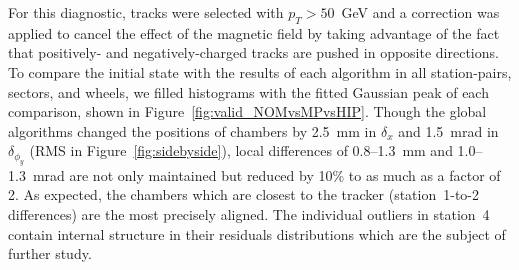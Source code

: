 For this diagnostic, tracks were selected with $p_T > 50$~GeV and a
correction was applied to cancel the effect of the magnetic field by
taking advantage of the fact that positively- and negatively-charged
tracks are pushed in opposite directions.
To compare the initial state with the results of each algorithm in all
station-pairs, sectors, and wheels, we filled histograms with the
fitted Gaussian peak of each comparison, shown in
Figure~\ref{fig:valid_NOMvsMPvsHIP}.  Though the global algorithms
changed the positions of chambers by 2.5~mm in $\delta_x$ and 1.5~mrad
in $\delta_{\phi_y}$ (RMS in Figure~\ref{fig:sidebyside}), local
differences of 0.8--1.3~mm and 1.0--1.3~mrad are not only maintained
but reduced by 10\% to as much as a factor of 2.  As expected, the chambers which are closest
to the tracker (station~1-to-2 differences) are the most precisely
aligned.  The individual outliers in station~4 contain internal
structure in their residuals distributions which are the subject of
further study.

 
